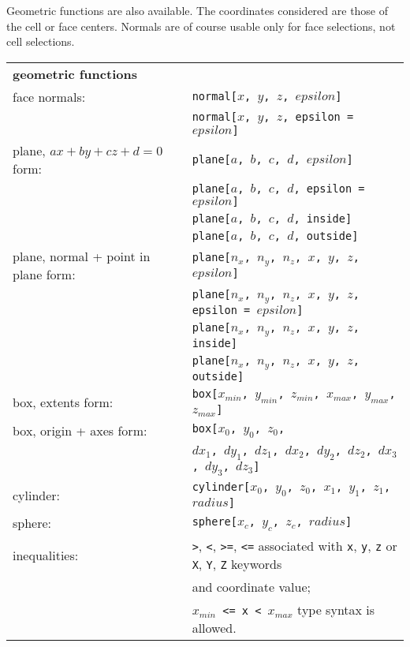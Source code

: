 {{{Geometric functions are also available. The coordinates considered are
those of the cell or face centers. Normals are of course
usable only for face selections, not cell selections.

\begin{tabular}[top]{p{6cm} l}
\multicolumn{2}{l}{\bf geometric functions }\\
face normals:   &  \texttt{normal[$x$, $y$, $z$, $epsilon$]} \\
                &  \texttt{normal[$x$, $y$, $z$, epsilon = $epsilon$]} \\
plane, $ax + by + cz + d = 0$ form: &  \texttt{plane[$a$, $b$, $c$, $d$, $epsilon$]} \\
                &  \texttt{plane[$a$, $b$, $c$, $d$, epsilon = $epsilon$]} \\
                &  \texttt{plane[$a$, $b$, $c$, $d$, inside]} \\
                &  \texttt{plane[$a$, $b$, $c$, $d$, outside]} \\
plane, normal + point in plane form: &  \texttt{plane[$n_x$, $n_y$, $n_z$, $x$, $y$, $z$, $epsilon$]} \\
                &  \texttt{plane[$n_x$, $n_y$, $n_z$, $x$, $y$, $z$, epsilon = $epsilon$]} \\
                &  \texttt{plane[$n_x$, $n_y$, $n_z$, $x$, $y$, $z$, inside]} \\
                &  \texttt{plane[$n_x$, $n_y$, $n_z$, $x$, $y$, $z$, outside]} \\
box, extents form: &  \texttt{box[$x_{min}$, $y_{min}$, $z_{min}$,
                                  $x_{max}$, $y_{max}$, $z_{max}$]} \\
box, origin + axes form: &  \texttt{box[$x_0$, $y_0$, $z_0$,}\\
                         &  \texttt{\qquad $dx_1$, $dy_1$, $dz_1$,
                                        $dx_2$, $dy_2$, $dz_2$,
                                        $dx_3$, $dy_3$, $dz_3$]} \\
cylinder:       &  \texttt{cylinder[$x_0$, $y_0$, $z_0$, $x_1$, $y_1$, $z_1$, $radius$]} \\
sphere:         &  \texttt{sphere[$x_c$, $y_c$, $z_c$, $radius$]} \\
inequalities:   &  \texttt{>}, \texttt{<}, \texttt{>=}, \texttt{<=} associated
                   with \texttt{x}, \texttt{y}, \texttt{z}  or
                   \texttt{X}, \texttt{Y}, \texttt{Z} keywords\\
                &   and coordinate value; \\
                &  \texttt{$x_{min}$ <= x < $x_{max}$} type syntax is allowed. \\
\end{tabular}

}}}
